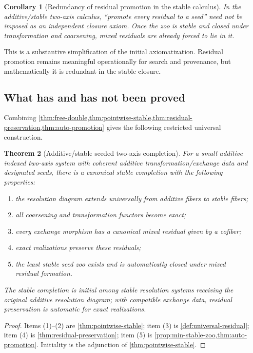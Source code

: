 \documentclass[11pt]{article}
\newtheorem{theorem}{Theorem}[section]
\newtheorem{corollary}[theorem]{Corollary}
\theoremstyle{definition}
\theoremstyle{remark}
\begin{document}
\begin{corollary}[Redundancy of residual promotion in the stable calculus]\label{cor:promotion-redundant}
In the additive/stable two-axis calculus, ``promote every residual to a seed'' need not be imposed as an independent closure axiom. Once the zoo is stable and closed under transformation and coarsening, mixed residuals are already forced to lie in it.
\end{corollary}

This is a substantive simplification of the initial axiomatization. Residual promotion remains meaningful operationally for search and provenance, but mathematically it is redundant in the stable closure.

\subsection{What has and has not been proved}

Combining \cref{thm:free-double,thm:pointwise-stable,thm:residual-preservation,thm:auto-promotion} gives the following restricted universal construction.

\begin{theorem}[Additive/stable seeded two-axis completion]\label{thm:additive-stable-completion}
For a small additive indexed two-axis system with coherent additive transformation/exchange data and designated seeds, there is a canonical stable completion with the following properties:
\begin{enumerate}
    \item the resolution diagram extends universally from additive fibers to stable fibers;
    \item all coarsening and transformation functors become exact;
    \item every exchange morphism has a canonical mixed residual given by a cofiber;
    \item exact realizations preserve these residuals;
    \item the least stable seed zoo exists and is automatically closed under mixed residual formation.
\end{enumerate}
The stable completion is initial among stable resolution systems receiving the original additive resolution diagram; with compatible exchange data, residual preservation is automatic for exact realizations.
\end{theorem}

\begin{proof}
Items (1)--(2) are \cref{thm:pointwise-stable}; item (3) is \cref{def:universal-residual}; item (4) is \cref{thm:residual-preservation}; item (5) is \cref{prop:min-stable-zoo,thm:auto-promotion}. Initiality is the adjunction of \cref{thm:pointwise-stable}.
\end{proof}
\end{document}

